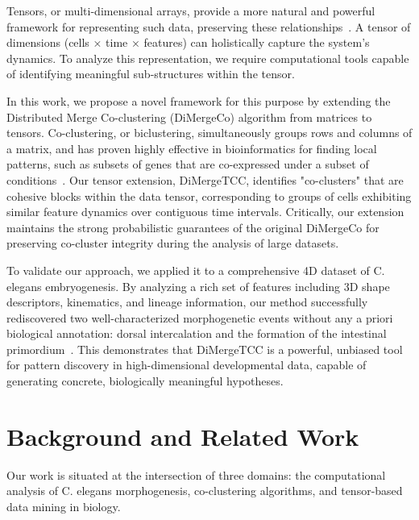 \documentclass[numsec,webpdf,modern,large]{oup-authoring-template}%
\theoremstyle{thmstyleone}%
\theoremstyle{thmstyletwo}%
\theoremstyle{thmstylethree}%
\begin{document}
Tensors, or multi-dimensional arrays, provide a more natural and powerful framework for representing such data, preserving these relationships~\citep{sun2008IncrementalTensorAnalysis}. A tensor of dimensions (cells × time × features) can holistically capture the system's dynamics. To analyze this representation, we require computational tools capable of identifying meaningful sub-structures within the tensor.

In this work, we propose a novel framework for this purpose by extending the Distributed Merge Co-clustering (DiMergeCo) algorithm from matrices to tensors. Co-clustering, or biclustering, simultaneously groups rows and columns of a matrix, and has proven highly effective in bioinformatics for finding local patterns, such as subsets of genes that are co-expressed under a subset of conditions~\citep{zapala2006MultivariateRegressionAnalysis}. Our tensor extension, DiMergeTCC, identifies "co-clusters" that are cohesive blocks within the data tensor, corresponding to groups of cells exhibiting similar feature dynamics over contiguous time intervals. Critically, our extension maintains the strong probabilistic guarantees of the original DiMergeCo for preserving co-cluster integrity during the analysis of large datasets.

To validate our approach, we applied it to a comprehensive 4D dataset of C. elegans embryogenesis. By analyzing a rich set of features including 3D shape descriptors, kinematics, and lineage information, our method successfully rediscovered two well-characterized morphogenetic events without any a priori biological annotation: dorsal intercalation and the formation of the intestinal primordium~\citep{bao2006AutomatedCellLineage,kaletta1997BinarySpecificationEmbryonic,artal-sanz2006CaenorhabditisElegansVersatile,sato2015LeftRightAsymmetric,stoeckius2009LargescaleSortingElegans}. This demonstrates that DiMergeTCC is a powerful, unbiased tool for pattern discovery in high-dimensional developmental data, capable of generating concrete, biologically meaningful hypotheses.

\section{Background and Related Work}

Our work is situated at the intersection of three domains: the computational analysis of C. elegans morphogenesis, co-clustering algorithms, and tensor-based data mining in biology.
\end{document}
